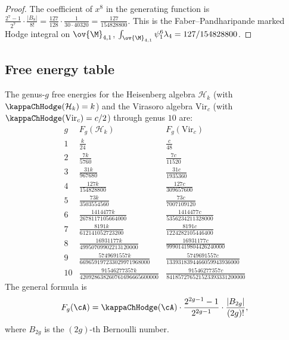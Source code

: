 \begin{proof}
The coefficient of $x^8$ in the generating function is
$\frac{2^7 - 1}{2^7} \cdot \frac{|B_8|}{8!} = \frac{127}{128} \cdot \frac{1}{30 \cdot 40320}
= \frac{127}{154828800}$.
This is the Faber--Pandharipande marked Hodge integral on
$\ov{\M}_{4,1}$,
\(\int_{\ov{\M}_{4,1}}\psi_1^6\lambda_4
=127/154828800\).
\end{proof}

\subsection{Free energy table}

\begin{theorem}
The genus-$g$ free energies for the Heisenberg algebra $\mathcal{H}_k$ (with
\(\kappaChHodge(\mathcal H_k)=k\)) and the Virasoro algebra
\(\mathrm{Vir}_c\) (with \(\kappaChHodge(\mathrm{Vir}_c)=c/2\))
through genus $10$ are:
\[
\renewcommand{\arraystretch}{1.4}
\begin{array}{c|c|c}
g & F_g(\mathcal{H}_k) & F_g(\mathrm{Vir}_c) \\
\hline
1 & \frac{k}{24} & \frac{c}{48} \\[3pt]
2 & \frac{7k}{5760} & \frac{7c}{11520} \\[3pt]
3 & \frac{31k}{967680} & \frac{31c}{1935360} \\[3pt]
4 & \frac{127k}{154828800} & \frac{127c}{309657600} \\[3pt]
5 & \frac{73k}{3503554560} & \frac{73c}{7007109120} \\[3pt]
6 & \frac{1414477k}{2678117105664000} & \frac{1414477c}{5356234211328000} \\[3pt]
7 & \frac{8191k}{612141052723200} & \frac{8191c}{1224282105446400} \\[3pt]
8 & \frac{16931177k}{49950709902213120000} & \frac{16931177c}{99901419804426240000} \\[3pt]
9 & \frac{5749691557k}{669659197233029971968000} & \frac{5749691557c}{1339318394466059943936000} \\[3pt]
10 & \frac{91546277357k}{420928638260761696665600000} & \frac{91546277357c}{841857276521523393331200000}
\end{array}
\]
The general formula is
\begin{equation}
\label{eq:fg-general}
F_g(\cA)
= \kappaChHodge(\cA) \cdot \frac{2^{2g-1} - 1}{2^{2g-1}} \cdot \frac{|B_{2g}|}{(2g)!},
\end{equation}
where $B_{2g}$ is the $(2g)$-th Bernoulli number.
\end{theorem}

